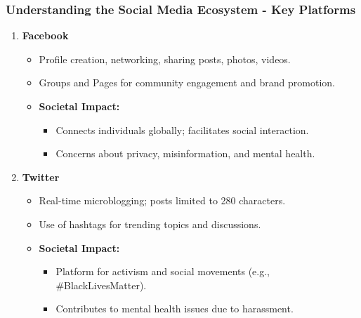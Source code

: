 \documentclass{beamer}
\begin{document}
\begin{frame}[fragile]
    \frametitle{Understanding the Social Media Ecosystem - Key Platforms}
    
    \begin{enumerate}
        \item \textbf{Facebook}
        \begin{itemize}
            \item Profile creation, networking, sharing posts, photos, videos.
            \item Groups and Pages for community engagement and brand promotion.
            \item \textbf{Societal Impact:}
            \begin{itemize}
                \item Connects individuals globally; facilitates social interaction.
                \item Concerns about privacy, misinformation, and mental health.
            \end{itemize}
        \end{itemize}
        
        \item \textbf{Twitter}
        \begin{itemize}
            \item Real-time microblogging; posts limited to 280 characters.
            \item Use of hashtags for trending topics and discussions.
            \item \textbf{Societal Impact:}
            \begin{itemize}
                \item Platform for activism and social movements (e.g., \#BlackLivesMatter).
                \item Contributes to mental health issues due to harassment.
            \end{itemize}
        \end{itemize}
    \end{enumerate}
\end{frame}
\end{document}
